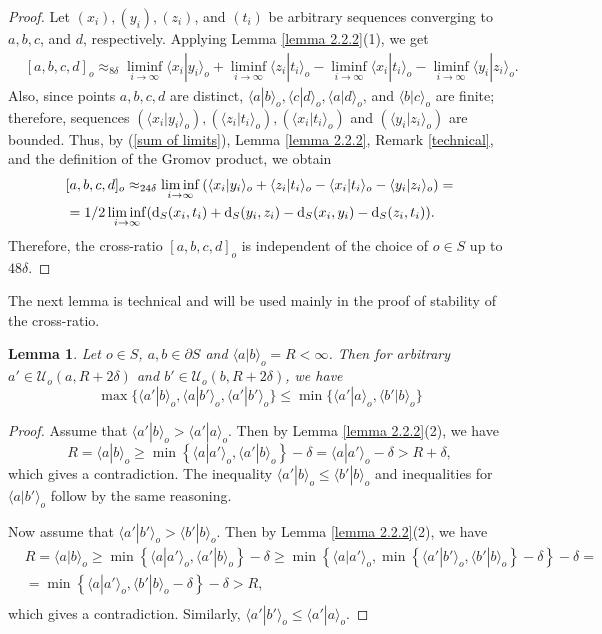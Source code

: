 \documentclass[11pt,letterpaper]{article}
\renewcommand{\d}{{\rm d}}
\renewcommand{\d}{{\rm d}}
\renewcommand{\l}{\langle}
\renewcommand{\r}{\rangle}
\newtheorem{lem}[thm]{Lemma}
\theoremstyle{definition}
\theoremstyle{remark}
\begin{document}
\begin{proof}
Let $(x_i), (y_i), (z_i)$, and $(t_i)$ be arbitrary sequences converging to $a, b, c$, and $d$, respectively. Applying Lemma \ref{lemma 2.2.2}(1), we get
\begin{equation}\label{sum of limits}
\begin{aligned}
&[a,b,c,d]_o \approx_{8\delta}
\liminf _{i \rightarrow \infty}\l x_i| y_i\r_o + \liminf _{i \rightarrow \infty}\l z_i| t_i\r_o - \liminf _{i \rightarrow \infty}\l x_i| t_i\r_o - \liminf _{i \rightarrow \infty}\l y_i| z_i\r_o.
\end{aligned}
\end{equation}
Also, since points $a, b, c, d$ are distinct, $\l a|b\r_o, \l c|d\r_o, \l a|d\r_o$, and $\l b|c\r_o$ are finite; therefore, sequences $(\l x_i| y_i\r_o), (\l z_i| t_i\r_o), (\l x_i| t_i\r_o)$ and $(\l y_i| z_i\r_o)$ are bounded.
Thus, by (\ref{sum of limits}), Lemma \ref{lemma 2.2.2}, Remark \ref{technical}, and the definition of the Gromov product, we obtain 
$$
\begin{aligned}
&[a,b,c,d]_o\approx_{24\delta} \liminf _{i \rightarrow \infty}\left(\l x_i| y_i\r_o+ \l z_i| t_i\r_o - \l x_i| t_i\r_o - \l y_i| z_i\r_o\right)=\\
&=1/2\liminf _{i \rightarrow \infty}(\d_S(x_i,t_i)+\d_S(y_i,z_i)-\d_S(x_i,y_i)-\d_S(z_i,t_i)).
\end{aligned}
$$
Therefore, the cross-ratio $[a,b,c,d]_o$ is independent of the choice of $o \in S$ up to $48\delta$.
\end{proof}
The next lemma is technical and will be used mainly in the proof of stability of the cross-ratio.
\begin{lem}\label{Gromov product is small}
Let $o\in S$, $a,b \in \partial S$ and $\l a|b\r_o=R < \infty$. Then for arbitrary $a' \in \mathcal U_o(a, R+2\delta)$ and $b' \in \mathcal U_o(b, R+2\delta)$, we have
\begin{equation}\label{a'|b}
\max\{\l a'|b\r_o, \l a|b'\r_o, \l a'|b'\r_o\} \leq \min\{ \l a'|a\r_o, \l b'|b\r_o\}
\end{equation}

\end{lem}
\begin{proof}
Assume that $\l a'|b\r_o > \l a'|a\r_o$. Then by Lemma \ref{lemma 2.2.2}(2), we have 
$$
R=\l a|b\r_o \geq \min\left\{\l a|a'\r_o,\l a'|b\r_o\right\} - \delta=\l a|a'\r_o - \delta > R+\delta,
$$
which gives a contradiction. The inequality $\l a'|b\r_o \leq \l b'|b\r_o$ and inequalities for $\l a|b'\r_o$ follow by the same reasoning.

Now assume that $\l a'|b'\r_o > \l b'|b\r_o$. Then by Lemma \ref{lemma 2.2.2}(2), we have
$$
\begin{aligned}
&R=\l a|b\r_o \geq \min\left\{\l a|a'\r_o,\l a'|b\r_o\right\} - \delta \geq \min\left\{\l a|a'\r_o,\min\left\{\l a'|b'\r_o,\l b'|b\r_o\right\} - \delta \right\} - \delta=\\
&=\min\left\{\l a|a'\r_o, \l b'|b\r_o  - \delta \right\} - \delta > R,\\
\end{aligned}
$$
which gives a contradiction. Similarly, $\l a'|b'\r_o \leq \l a'|a\r_o$.
\end{proof}
\end{document}
